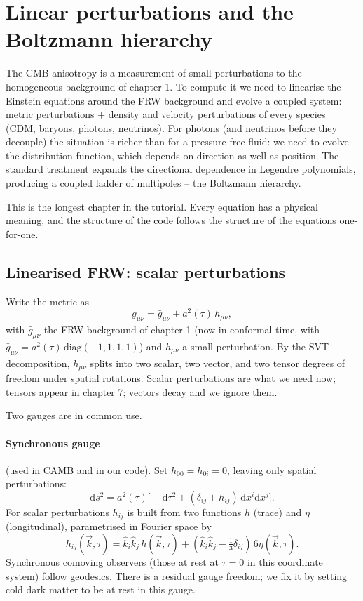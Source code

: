 \section{Linear perturbations and the Boltzmann hierarchy}
\label{ch:perturbations}

The CMB anisotropy is a measurement of small perturbations to the homogeneous background of chapter 1. To compute it we need to linearise the Einstein equations around the FRW background and evolve a coupled system: metric perturbations $+$ density and velocity perturbations of every species (CDM, baryons, photons, neutrinos). For photons (and neutrinos before they decouple) the situation is richer than for a pressure-free fluid: we need to evolve the distribution function, which depends on direction as well as position. The standard treatment expands the directional dependence in Legendre polynomials, producing a coupled ladder of multipoles -- the Boltzmann hierarchy.

This is the longest chapter in the tutorial. Every equation has a physical meaning, and the structure of the code follows the structure of the equations one-for-one.

\subsection{Linearised FRW: scalar perturbations}

Write the metric as
\[
  g_{\mu\nu} = \bar g_{\mu\nu} + a^2(\tau)\, h_{\mu\nu},
\]
with $\bar g_{\mu\nu}$ the FRW background of chapter 1 (now in conformal time, with $\bar g_{\mu\nu} = a^2(\tau)\,\mathrm{diag}(-1,1,1,1)$) and $h_{\mu\nu}$ a small perturbation. By the SVT decomposition, $h_{\mu\nu}$ splits into two scalar, two vector, and two tensor degrees of freedom under spatial rotations. Scalar perturbations are what we need now; tensors appear in chapter 7; vectors decay and we ignore them.

Two gauges are in common use.

\paragraph{Synchronous gauge} (used in CAMB and in our code). Set $h_{00} = h_{0i} = 0$, leaving only spatial perturbations:
\begin{equation}
  \mathrm{d}s^2 = a^2(\tau)\bigl[-\mathrm{d}\tau^2 + (\delta_{ij} + h_{ij})\,\mathrm{d}x^i \mathrm{d}x^j\bigr].
  \label{eq:synch_gauge}
\end{equation}
For scalar perturbations $h_{ij}$ is built from two functions $h$ (trace) and $\eta$ (longitudinal), parametrised in Fourier space by
\[
  h_{ij}(\vec k, \tau) = \hat k_i \hat k_j\, h(\vec k, \tau) + (\hat k_i \hat k_j - \tfrac{1}{3}\delta_{ij})\, 6\eta(\vec k, \tau).
\]
Synchronous comoving observers (those at rest at $\tau = 0$ in this coordinate system) follow geodesics. There is a residual gauge freedom; we fix it by setting cold dark matter to be at rest in this gauge.


